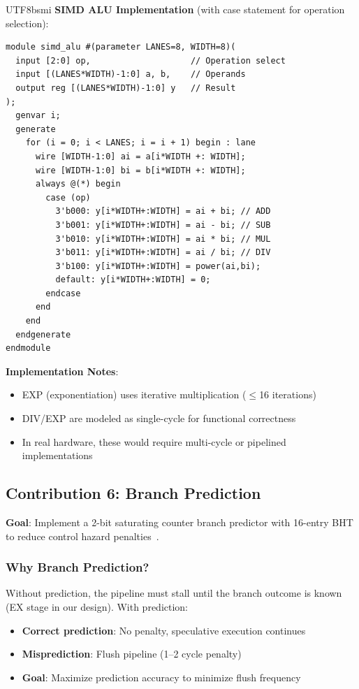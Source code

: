 \documentclass[journal,twoside]{IEEEtran}
\begin{document}
\begin{CJK}{UTF8}{bsmi}
\textbf{SIMD ALU Implementation} (with case statement for operation selection):
\begin{lstlisting}
module simd_alu #(parameter LANES=8, WIDTH=8)(
  input [2:0] op,                    // Operation select
  input [(LANES*WIDTH)-1:0] a, b,    // Operands
  output reg [(LANES*WIDTH)-1:0] y   // Result
);
  genvar i;
  generate
    for (i = 0; i < LANES; i = i + 1) begin : lane
      wire [WIDTH-1:0] ai = a[i*WIDTH +: WIDTH];
      wire [WIDTH-1:0] bi = b[i*WIDTH +: WIDTH];
      always @(*) begin
        case (op)
          3'b000: y[i*WIDTH+:WIDTH] = ai + bi; // ADD
          3'b001: y[i*WIDTH+:WIDTH] = ai - bi; // SUB
          3'b010: y[i*WIDTH+:WIDTH] = ai * bi; // MUL
          3'b011: y[i*WIDTH+:WIDTH] = ai / bi; // DIV
          3'b100: y[i*WIDTH+:WIDTH] = power(ai,bi);
          default: y[i*WIDTH+:WIDTH] = 0;
        endcase
      end
    end
  endgenerate
endmodule
\end{lstlisting}

\textbf{Implementation Notes}:
\begin{itemize}
    \item EXP (exponentiation) uses iterative multiplication ($\leq$16 iterations)
    \item DIV/EXP are modeled as single-cycle for functional correctness
    \item In real hardware, these would require multi-cycle or pipelined implementations
\end{itemize}

\FloatBarrier  %
\subsection{Contribution 6: Branch Prediction}

\textbf{Goal}: Implement a 2-bit saturating counter branch predictor with 16-entry BHT to reduce control hazard penalties~\cite{smith1981study}.

\subsubsection{Why Branch Prediction?}
Without prediction, the pipeline must stall until the branch outcome is known (EX stage in our design). With prediction:
\begin{itemize}
    \item \textbf{Correct prediction}: No penalty, speculative execution continues
    \item \textbf{Misprediction}: Flush pipeline (1--2 cycle penalty)
    \item \textbf{Goal}: Maximize prediction accuracy to minimize flush frequency
\end{itemize}


\end{CJK}
\end{document}
